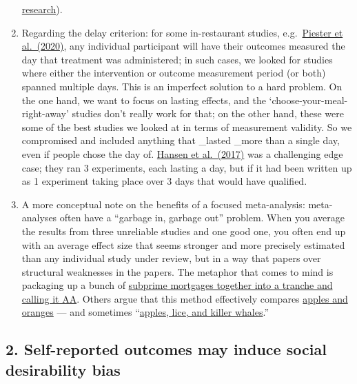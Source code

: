 \documentclass[
  letterpaper,
  DIV=11,
  numbers=noendperiod]{scrartcl}
\begin{document}
\begin{enumerate}
  \href{https://www.ncbi.nlm.nih.gov/pmc/articles/PMC2346472/}{research}).
\item
  Regarding the delay criterion: for some in-restaurant studies,
  e.g.~\href{https://www.sciencedirect.com/science/article/abs/pii/S0195666319312115?via\%3Dihub}{Piester
  et al.~(2020)}, any individual participant will have their outcomes
  measured the day that treatment was administered; in such cases, we
  looked for studies where either the intervention or outcome
  measurement period (or both) spanned multiple days. This is an
  imperfect solution to a hard problem. On the one hand, we want to
  focus on lasting effects, and the `choose-your-meal-right-away'
  studies don't really work for that; on the other hand, these were some
  of the best studies we looked at in terms of measurement validity. So
  we compromised and included anything that \_lasted \_more than a
  single day, even if people chose the day of.
  \href{https://academic.oup.com/jpubhealth/article/43/2/392/5637580}{Hansen
  et al.~(2017)} was a challenging edge case; they ran 3 experiments,
  each lasting a day, but if it had been written up as 1 experiment
  taking place over 3 days that would have qualified.
\item
  A more conceptual note on the benefits of a focused meta-analysis:
  meta-analyses often have a ``garbage in, garbage out'' problem. When
  you average the results from three unreliable studies and one good
  one, you often end up with an average effect size that seems stronger
  and more precisely estimated than any individual study under review,
  but in a way that papers over structural weaknesses in the papers. The
  metaphor that comes to mind is packaging up a bunch of
  \href{https://www.youtube.com/watch?v=II4Ct2n5FiE}{subprime mortgages
  together into a tranche and calling it AA}. Others argue that this
  method effectively compares
  \href{https://onlinelibrary.wiley.com/doi/abs/10.1111/ajps.12742}{apples
  and oranges} --- and sometimes
  ``\href{https://vitamindwiki.com/The+Misuse+of+Meta-analysis+in+Nutrition+Research+\%28and+vitamin+D\%29+\%E2\%80\%93+JAMA+Oct+2017}{apples,
  lice, and killer whales}.''
\end{enumerate}

\subsection{2. Self-reported outcomes may induce social desirability
bias}\label{self-reported-outcomes-may-induce-social-desirability-bias}
\end{document}
